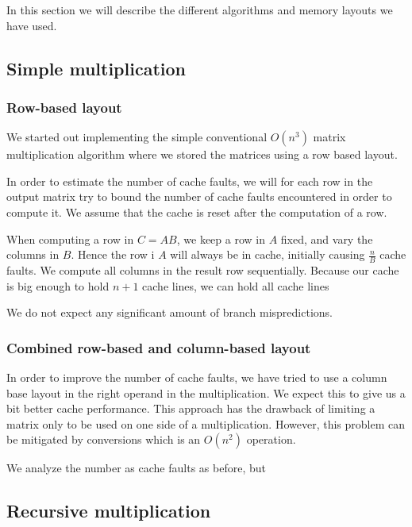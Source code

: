 In this section we will describe the different algorithms and memory
layouts we have used.

\subsection{Simple multiplication}

\subsubsection{Row-based layout}
We started out implementing the simple conventional $O(n^3)$ matrix
multiplication algorithm where we stored the matrices using a row
based layout.

In order to estimate the number of cache faults, we will for each row
in the output matrix try to bound the number of cache faults
encountered in order to compute it. We assume that the cache is reset
after the computation of a row.

When computing a row in $C = AB$, we keep a row in $A$ fixed, and vary
the columns in $B$. Hence the row i $A$ will always be in cache,
initially causing $\frac{n}{B}$ cache faults. We compute all columns
in the result row sequentially. Because our cache is big enough to
hold $n+1$ cache lines, we can hold all cache lines



We do not expect any significant amount of branch mispredictions.

\subsubsection{Combined row-based and column-based layout}

In order to improve the number of cache faults, we have tried to use a
column base layout in the right operand in the multiplication. We
expect this to give us a bit better cache performance. This approach
has the drawback of limiting a matrix only to be used on one side of a
multiplication. However, this problem can be mitigated by conversions which is an $O(n^2)$ operation.

We analyze the number as cache faults as before, but 

\subsection{Recursive multiplication}

